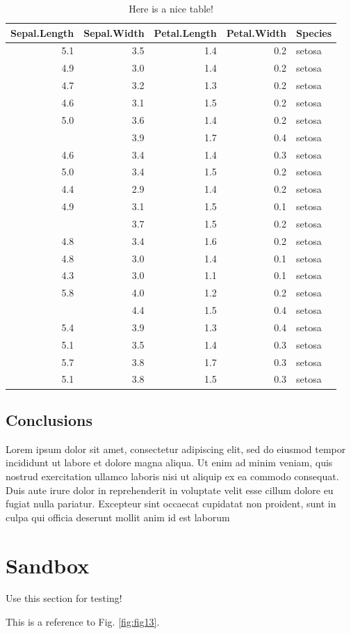 \documentclass[]{book}
\theoremstyle{definition}
\theoremstyle{definition}
\theoremstyle{definition}
\theoremstyle{remark}
\begin{document}
\begin{table}

\caption{\label{tab:tab1}Here is a nice table!}
\centering
\begin{tabular}[t]{rrrrl}
\toprule
Sepal.Length & Sepal.Width & Petal.Length & Petal.Width & Species\\
\midrule
5.1 & 3.5 & 1.4 & 0.2 & setosa\\
4.9 & 3.0 & 1.4 & 0.2 & setosa\\
4.7 & 3.2 & 1.3 & 0.2 & setosa\\
4.6 & 3.1 & 1.5 & 0.2 & setosa\\
5.0 & 3.6 & 1.4 & 0.2 & setosa\\
\addlinespace
5.4 & 3.9 & 1.7 & 0.4 & setosa\\
4.6 & 3.4 & 1.4 & 0.3 & setosa\\
5.0 & 3.4 & 1.5 & 0.2 & setosa\\
4.4 & 2.9 & 1.4 & 0.2 & setosa\\
4.9 & 3.1 & 1.5 & 0.1 & setosa\\
\addlinespace
5.4 & 3.7 & 1.5 & 0.2 & setosa\\
4.8 & 3.4 & 1.6 & 0.2 & setosa\\
4.8 & 3.0 & 1.4 & 0.1 & setosa\\
4.3 & 3.0 & 1.1 & 0.1 & setosa\\
5.8 & 4.0 & 1.2 & 0.2 & setosa\\
\addlinespace
5.7 & 4.4 & 1.5 & 0.4 & setosa\\
5.4 & 3.9 & 1.3 & 0.4 & setosa\\
5.1 & 3.5 & 1.4 & 0.3 & setosa\\
5.7 & 3.8 & 1.7 & 0.3 & setosa\\
5.1 & 3.8 & 1.5 & 0.3 & setosa\\
\bottomrule
\end{tabular}
\end{table}

\section{Conclusions}\label{conclusions}

Lorem ipsum dolor sit amet, consectetur adipiscing elit, sed do eiusmod
tempor incididunt ut labore et dolore magna aliqua. Ut enim ad minim
veniam, quis nostrud exercitation ullamco laboris nisi ut aliquip ex ea
commodo consequat. Duis aute irure dolor in reprehenderit in voluptate
velit esse cillum dolore eu fugiat nulla pariatur. Excepteur sint
occaecat cupidatat non proident, sunt in culpa qui officia deserunt
mollit anim id est laborum

\chapter{Sandbox}\label{sandbox}

Use this section for testing!

This is a reference to Fig. \ref{fig:fig13}.


\end{document}
